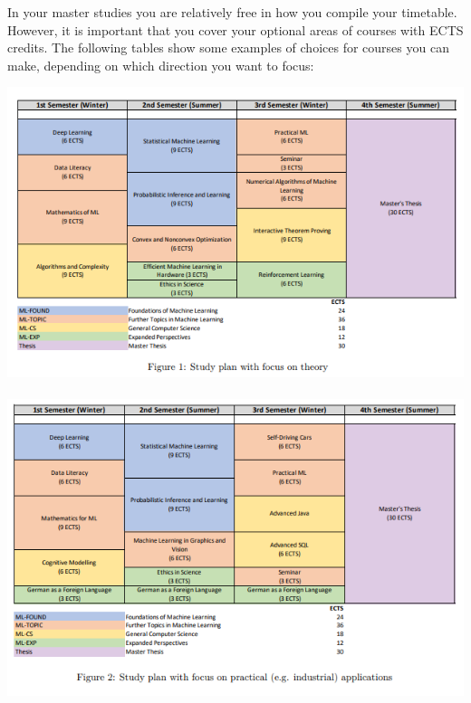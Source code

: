 In your master studies you are relatively free in how you compile your timetable. However, it is important that you cover your optional areas of courses with ECTS credits. 
The following tables show some examples of choices for courses you can make, depending on which direction you want to focus:\\

\begin{center}
\includegraphics[scale=0.65]{media/ML_Theorie}~\\
\includegraphics[scale=0.65]{media/ML_Praktisch}~\\

\end{center}
